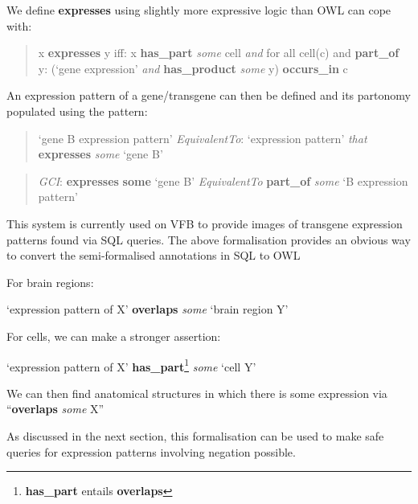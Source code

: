 \documentclass[runningheads,a4paper]{llncs}
\begin{document}
We define \textbf{expresses} using slightly more expressive logic than OWL can
cope with:

\begin{quote} 
x \textbf{expresses} y iff:  x \textbf{has\_part} \textit{some} cell \textit{and}
for all cell(c) and \textbf{part\_of} y: (`gene expression'
\textit{and} \textbf{has\_product} \textit{some} y)
\textbf{occurs\_in} c  %
\end{quote}

An expression pattern of a gene/transgene can then be defined and its
partonomy populated using the pattern:

\begin{quote} 
`gene B expression pattern'
\textit{EquivalentTo}: `expression pattern' \textit{that} \textbf{expresses} \textit{some} `gene B'\end{quote}
\begin{quote} \textit{GCI}: \textbf{expresses} \textbf{some} `gene B' \textit{EquivalentTo} \textbf{part\_of} \textit{some} `B expression pattern'
\end{quote}

 
This system is currently used on VFB to provide images of transgene
expression patterns found via SQL queries. The above formalisation
provides an obvious way to convert the semi-formalised annotations in
SQL to OWL

For brain regions: 

`expression pattern of X' \textbf{overlaps} \textit{some} `brain region Y'

For cells, we can make a stronger assertion:

`expression pattern of X'
\textbf{has\_part}\footnote{\textbf{has\_part} entails \textbf{overlaps}} \textit{some} `cell Y'

We can then find anatomical structures in which there is some
expression via ``\textbf{overlaps} \textit{some} X''

As discussed in the next section, this formalisation can be used to
make safe queries for expression patterns involving negation possible.


\end{document}
